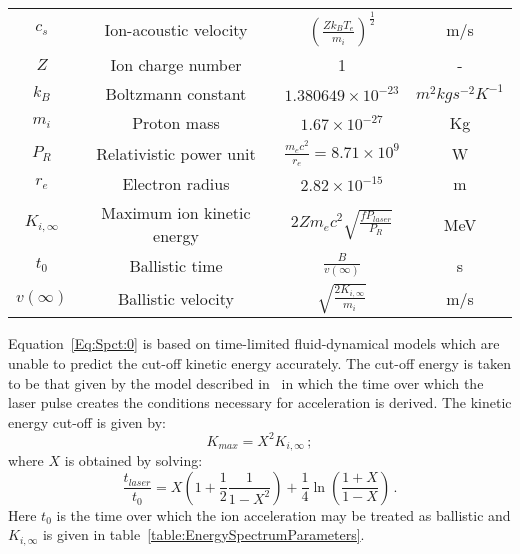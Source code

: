 \begin{table}
\begin{center}
\begin{tabular}{c c c c}
      $c_{s}$ & Ion-acoustic velocity & $(\frac{Z k_{B} T_{e}}{m_{i}})^{\frac{1}{2}}$ & m/s \\  
      $Z$ & Ion charge number & 1 & - \\  
      $k_{B}$ & Boltzmann constant & $1.380649 \times 10^{-23}$ & $m^{2} kg s^{-2} K^{-1}$ \\  
      $m_{i}$ & Proton mass & $1.67 \times 10^{-27}$ & Kg \\ 
      $P_{R}$ & Relativistic power unit & $\frac{m_{e} c^{2}}{r_{e}} = 8.71 \times 10^{9}$ & W \\  
      $r_{e}$ & Electron radius & $2.82 \times 10^{-15}$ & m \\  
      $K_{i,\infty}$ & Maximum ion kinetic energy & $2 Z m_{e} c^{2} \sqrt{\frac{f P_{laser}}{P_{R}}}$ & MeV \\  
      $t_{0}$ & Ballistic time & $\frac{B}{v(\infty)}$ & s \\  
      $v(\infty)$ & Ballistic velocity & $\sqrt{\frac{2 K_{i,\infty}}{m_{i}}}$ & m/s \\  
      \hline
    \end{tabular}
  \end{center}
\end{table}

Equation~\ref{Eq:Spct:0} is based on time-limited fluid-dynamical
models which are unable to predict the cut-off kinetic energy
accurately. 
The cut-off energy is taken to be that given by the model described
in~\cite{10.1103/PhysRevLett.97.045005} in which the time over which
the laser pulse creates the conditions necessary for acceleration is
derived.
The kinetic energy cut-off is given by:
\begin{equation}
  K_{max} = X^{2} K_{i,\infty} \, ;
  \label{eq:Eq:Spct:2}
\end{equation}
where $X$ is obtained by solving:
\begin{equation}
  \frac{t_{laser}}{t_{0}} = X \left( 1 + \frac{1}{2}
                           \frac{1}{1 - X^{2}} \right) +
                           \frac{1}{4} \ln \left( \frac{1+X}{1-X} \right) \, .
  \label{eq:Eq:Spct:1}
\end{equation}
Here $t_0$ is the time over which the ion acceleration may be treated
as ballistic and $K_{i,\infty}$ is given in
table~\ref{table:EnergySpectrumParameters}.

